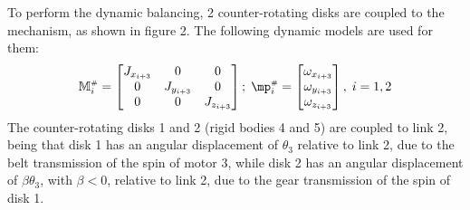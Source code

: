 \documentclass[a4paper,11pt,brazil,fleqn]{article}
\begin{document}
To perform the dynamic balancing, 2 counter-rotating disks are coupled to the mechanism, as shown in figure 2. The following dynamic models are used for them:
\begin{equation}\label{eq:DiscsModel2}
\mM\ssh_i = \begin{bmatrix} J_{x_{i+3}} & 0 & 0 \\ 0 & J_{y_{i+3}} & 0 \\ 0 & 0 & J_{z_{i+3}} \end{bmatrix}; \; \mp\ssh_i = \begin{bmatrix} \omega_{x_{i+3}} \\ \omega_{y_{i+3}} \\ \omega_{z_{i+3}} \end{bmatrix}, \; i = 1, 2
\end{equation}
The counter-rotating disks 1 and 2 (rigid bodies 4 and 5) are coupled to link 2, being that disk 1 has an angular displacement of $\theta_3$ relative to link 2, due to the belt transmission of the spin of motor 3, while disk 2 has an angular displacement of $\beta\theta_3$, with $\beta < 0$, relative to link 2, due to the gear transmission of the spin of disk 1.
\end{document}
